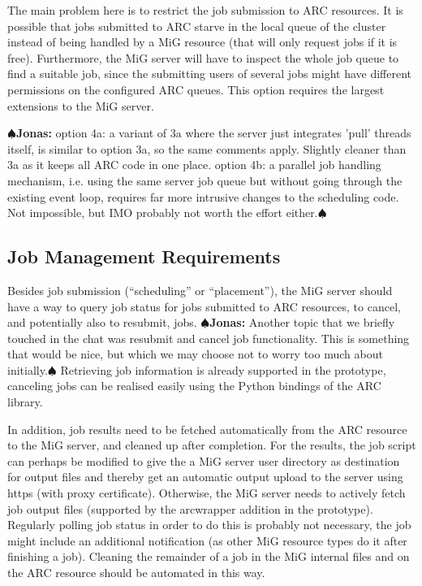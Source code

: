 \documentclass[11pt]{article}
\newcommand{\comm}[2]{{\scriptsize
    \(\spadesuit\){\bf #1: }{\rm \sf #2}\(\spadesuit\)}}
\newcommand{\jonas}[1]{\comm{Jonas}{#1}}
\begin{document}
    The main problem here is to restrict the job submission to ARC
    resources. It is possible that jobs submitted to ARC starve in the
    local queue of the cluster instead of being handled by a MiG
    resource (that will only request jobs if it is free). Furthermore,
    the MiG server will have to inspect the whole job queue to find a
    suitable job, since the submitting users of several jobs might
    have different permissions on the configured ARC queues. This
    option requires the largest extensions to the MiG server.


\jonas{option 4a: a variant of 3a where the server just integrates
  'pull' threads itself, is similar to option 3a, so the same comments
  apply.  Slightly cleaner than 3a as it keeps all ARC code in one
  place.  option 4b: a parallel job handling mechanism, i.e. using the
  same server job queue but without going through the existing event
  loop, requires far more intrusive changes to the scheduling
  code. Not impossible, but IMO probably not worth the effort either.}


\subsection{Job Management Requirements}
Besides job submission (``scheduling'' or ``placement''), the MiG
server should have a way to query job status for jobs submitted to ARC
resources, to cancel, and potentially also to resubmit, jobs.
%
\jonas{Another topic
  that we briefly touched in the chat was resubmit and cancel job
  functionality. This is something that would be nice, but which we
  may choose not to worry too much about initially.}
%
Retrieving job information is already supported in the prototype,
canceling jobs can be realised easily using the Python bindings of the
ARC library. 

In addition, job results need to be fetched automatically from the ARC
resource to the MiG server, and cleaned up after completion.
For the results, the job script can perhaps be modified to give the a
MiG server user directory as destination for output files and thereby
get an automatic output upload to the server using https (with proxy
certificate). Otherwise, the MiG server needs to actively fetch job
output files (supported by the arcwrapper addition in the prototype).
Regularly polling job status in order to do this is probably not
necessary, the job might include an additional notification (as other
MiG resource types do it after finishing a job). Cleaning the
remainder of a job in the MiG internal files and on the ARC resource
should be automated in this way.
\end{document}
